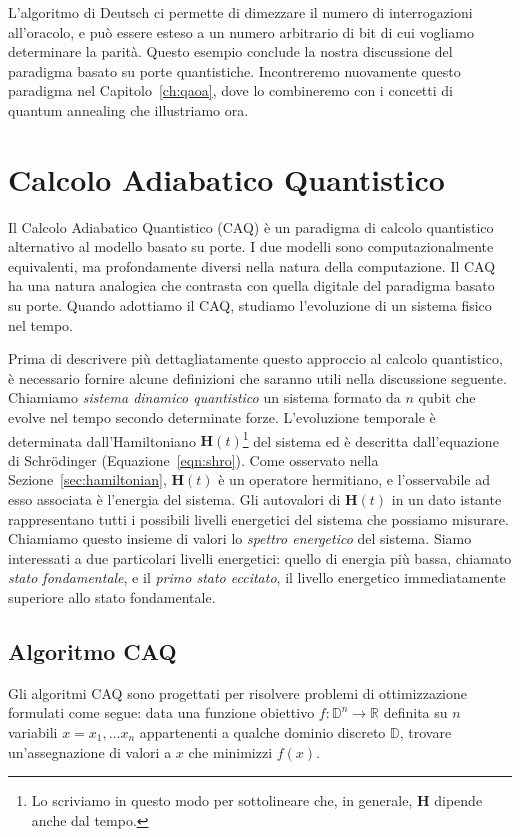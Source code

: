 L'algoritmo di Deutsch ci permette di dimezzare il numero di interrogazioni all'oracolo, e può essere esteso a un numero arbitrario di bit di cui vogliamo determinare la parità. Questo esempio conclude la nostra discussione del paradigma basato su porte quantistiche. Incontreremo nuovamente questo paradigma nel Capitolo~\ref{ch:qaoa}, dove lo combineremo con i concetti di quantum annealing che illustriamo ora.

\section{Calcolo Adiabatico Quantistico}
\label{sec:qac_model}
Il Calcolo Adiabatico Quantistico (CAQ) è un paradigma di calcolo quantistico alternativo al modello basato su porte. I due modelli sono computazionalmente equivalenti, ma profondamente diversi nella natura della computazione. Il CAQ ha una natura analogica che contrasta con quella digitale del paradigma basato su porte. Quando adottiamo il CAQ, studiamo l'evoluzione di un sistema fisico nel tempo. 

Prima di descrivere più dettagliatamente questo approccio al calcolo quantistico, è necessario fornire alcune definizioni che saranno utili nella discussione seguente. Chiamiamo \emph{sistema dinamico quantistico} un sistema formato da $n$ qubit che evolve nel tempo secondo determinate forze. L'evoluzione temporale è determinata dall'Hamiltoniano $\mathbf{H}(t)$\footnote{Lo scriviamo in questo modo per sottolineare che, in generale, $\mathbf{H}$ dipende anche dal tempo.} del sistema ed è descritta dall'equazione di Schrödinger (Equazione~\ref{eqn:shro}). Come osservato nella Sezione~\ref{sec:hamiltonian}, $\mathbf{H}(t)$ è un operatore hermitiano, e l'osservabile ad esso associata è l'energia del sistema. Gli autovalori di $\mathbf{H}(t)$ in un dato istante rappresentano tutti i possibili livelli energetici del sistema che possiamo misurare. Chiamiamo questo insieme di valori lo \emph{spettro energetico} del sistema. Siamo interessati a due particolari livelli energetici: quello di energia più bassa, chiamato \emph{stato fondamentale}, e il \emph{primo stato eccitato}, il livello energetico immediatamente superiore allo stato fondamentale.

\subsection{Algoritmo CAQ}
\label{sec:qac}
Gli algoritmi CAQ sono progettati per risolvere problemi di ottimizzazione formulati come segue: data una funzione obiettivo $f: \mathbb{D}^n\rightarrow\mathbb{R}$ definita su $n$ variabili $x = x_1, \dots x_n$ appartenenti a qualche dominio discreto $\mathbb{D}$, trovare un'assegnazione di valori a $x$ che minimizzi $f(x)$.

